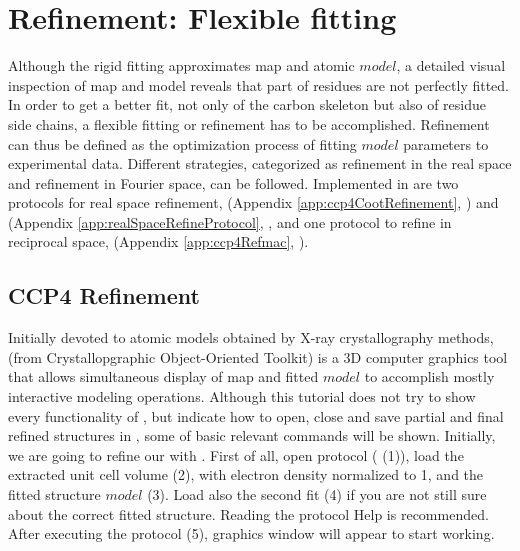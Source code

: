 \section{Refinement: Flexible fitting}
\label{refinementFlexibleFitting}
Although the rigid fitting approximates map and atomic $model$, a detailed visual inspection of map and model reveals that part of residues are not perfectly fitted. In order to get a better fit, not only of the carbon skeleton but also of residue side chains, a flexible fitting or refinement has to be accomplished. Refinement can thus be defined as the optimization process of fitting $model$ parameters to experimental data. Different strategies, categorized as refinement in the real space and refinement in Fourier space, can be followed. Implemented in \scipion are two protocols for real space refinement,  (Appendix \ref{app:ccp4CootRefinement}, \citep{emsley2010}) and  (Appendix \ref{app:realSpaceRefineProtocol}, \citep{afonine2018}, and one protocol to refine in reciprocal space,  (Appendix \ref{app:ccp4Refmac}, \citep{vagin2004}).

 \subsection*{CCP4 \coot Refinement}
 
 Initially devoted to atomic models obtained by X-ray crystallography methods, \coot (from Crystallopgraphic Object-Oriented Toolkit) is a 3D computer graphics tool that allows simultaneous display of map and fitted $model$ to accomplish mostly interactive modeling operations. Although this tutorial does not try to show every functionality of \coot, but indicate how to open, close and save partial and final \coot refined structures in \scipion, some of \coot basic relevant commands will be shown. Initially, we are going to refine our  with \coot. First of all, open  protocol ( (1)), load the extracted unit cell volume (2), with electron density normalized to 1, and the fitted structure $model$ (3). Load also the second fit (4) if you are not still sure about the correct fitted structure. Reading the protocol Help is recommended. After executing the protocol (5), \coot graphics window will appear to start working. 
 
